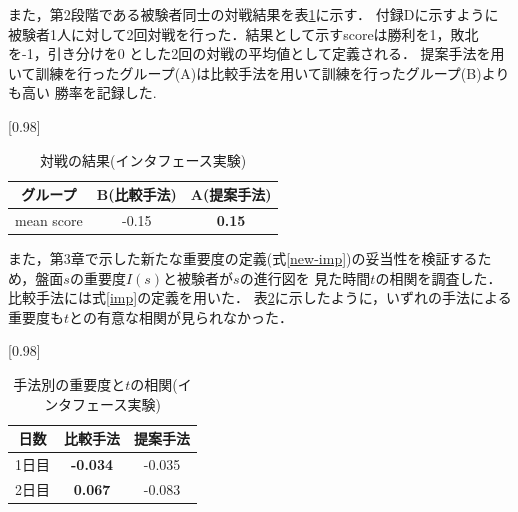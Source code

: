 \begin{table}[H]
    \caption{先読み手数制限なしの場合(インタフェース実験)}
    \scriptsize
    \centering
    \label{table:system-100}
\end{table}
また，第2段階である被験者同士の対戦結果を表\ref{table:result-battle}に示す．
付録Dに示すように被験者1人に対して2回対戦を行った．結果として示すscoreは勝利を1，敗北を-1，引き分けを0
とした2回の対戦の平均値として定義される．
提案手法を用いて訓練を行ったグループ(A)は比較手法を用いて訓練を行ったグループ(B)よりも高い
勝率を記録した.
\begin{table}[H]
	\caption{対戦の結果(インタフェース実験)}
    \label{table:result-battle}
	\centering
	\scalebox{0.98}[0.98]{
		\begin{tabular}{c|c|c}
            グループ & B(比較手法)  & A(提案手法) \\ \hline
			mean score &  -0.15   & \bf{0.15}\\ \hline
		\end{tabular}
	}
	
\end{table}
また，第3章で示した新たな重要度の定義(式\ref{new-imp})の妥当性を検証するため，盤面$s$の重要度$I(s)$と被験者が$s$の進行図を
見た時間$t$の相関を調査した．比較手法には式\ref{imp}の定義を用いた．
表\ref{table:result-imp}に示したように，いずれの手法による重要度も$t$との有意な相関が見られなかった．
\begin{table}[H]
	\caption{手法別の重要度と$t$の相関(インタフェース実験)}
    \label{table:result-imp}
	\centering
	\scalebox{0.98}[0.98]{
		\begin{tabular}{c|c|c}
			日数& 比較手法& 提案手法  \\ \hline
			1日目& \bf{-0.034}& {-0.035}\\
            2日目& \bf{0.067}& {-0.083}\\
		\end{tabular}
	}
	
\end{table}


